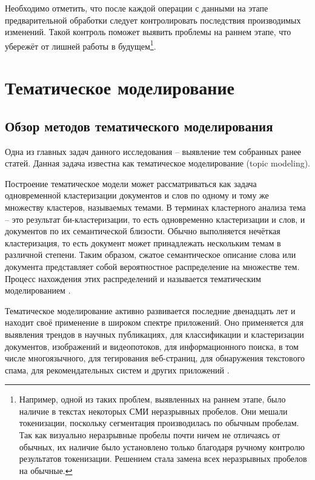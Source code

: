 Необходимо отметить, что после каждой операции с данными на этапе предварительной обработки следует контролировать последствия производимых изменений. Такой контроль поможет выявить проблемы на раннем этапе, что убережёт от лишней работы в будущем\footnote{Например, одной из таких проблем, выявленных на раннем этапе, было наличие в текстах некоторых СМИ неразрывных пробелов. Они мешали токенизации, поскольку сегментация производилась по обычным пробелам. Так как визуально неразрывные пробелы почти ничем не отличаясь от обычных, их наличие было установлено только благодаря ручному контролю результатов токенизации. Решением стала замена всех неразрывных пробелов на обычные.}.

\section{Тематическое моделирование}

\subsection{Обзор методов тематического моделирования}
Одна из главных задач данного исследования -- выявление тем собранных ранее статей. Данная задача известна как тематическое моделирование (topic modeling).

Построение тематическое модели может рассматриваться как задача одновременной кластеризации документов и слов по одному и тому же множеству кластеров, называемых темами. В терминах кластерного анализа тема -- это результат би-кластеризации, то есть одновременно кластеризации и слов, и документов по их семантической близости. Обычно выполняется нечёткая кластеризация, то есть документ может принадлежать нескольким темам в различной степени. Таким образом, сжатое семантическое описание слова или документа представляет собой вероятностное распределение на множестве тем. Процесс нахождения этих распределений и называется тематическим моделированием \cite{korshunov2012}.

Тематическое моделирование активно развивается последние двенадцать лет и находит своё применение в широком спектре приложений. Оно применяется для выявления трендов в научных публикациях, для классификации и кластеризации документов, изображений и видеопотоков, для информационного поиска, в том числе многоязычного, для тегирования веб-страниц, для обнаружения текстового спама, для рекомендательных систем и других приложений \cite[стр. 4]{voroncov2013}. 

